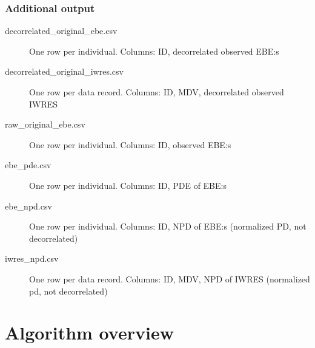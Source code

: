 \subsubsection*{Additional output}
\begin{description}
\item[decorrelated\_original\_ebe.csv] One row per individual. Columns: ID, decorrelated observed EBE:s
\item[decorrelated\_original\_iwres.csv] One row per data record. Columns: ID, MDV, decorrelated observed IWRES
\item[raw\_original\_ebe.csv]  One row per individual. Columns: ID, observed EBE:s
\item[ebe\_pde.csv] One row per individual. Columns: ID, PDE of EBE:s
\item[ebe\_npd.csv] One row per individual. Columns: ID, NPD of EBE:s (normalized PD, not decorrelated)
\item[iwres\_npd.csv]  One row per data record. Columns: ID, MDV, NPD of IWRES (normalized pd, not decorrelated)
\end{description}

\section{Algorithm overview}

